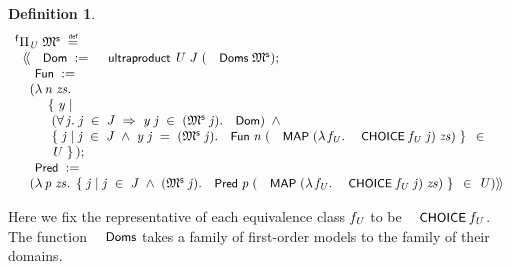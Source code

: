 \documentclass{llncs}
\newtheorem{defn}{Definition}[chapter]
\newenvironment{holmath}{\begin{displaymath}\begin{array}{l}}{\end{array}\end{displaymath}\ignorespacesafterend}
\renewcommand{\HOLConst}[1]{{\textsf{\upshape\small #1}}}
\renewcommand{\HOLinline}[1]{\ensuremath{#1}}
\renewcommand{\HOLFieldName}[1]{\HOLConst{#1}}
\renewcommand{\HOLTokenLeftrec}{\ensuremath{\langle\!\langle}}
\renewcommand{\HOLTokenRightrec}{\ensuremath{\rangle\!\rangle}}
\renewcommand{\HOLTokenBar}{\mbox{$|$}}
\begin{document}
\begin{defn}
{\upshape\cite[Definition A.18 (Ultraproduct of First-Order Models)]{Blackburn}}
\begin{holmath}
  {}^{\sf f}\Pi\sb{\HOLFreeVar{U}}\;\HOLFreeVar{\ensuremath{\mathfrak{M}\sp{\sf s}}}\;\HOLTokenDefEquality{}\\
\;\;\HOLTokenLeftrec{}\HOLFieldName{Dom}\;:=\;\HOLConst{ultraproduct}\;\HOLFreeVar{U}\;\HOLFreeVar{J}\;(\HOLConst{Doms}\;\HOLFreeVar{\ensuremath{\mathfrak{M}\sp{\sf s}}});\\
\;\;\HOLFieldName{Fun}\;:=\\
\;\;\;\;(\HOLTokenLambda{}\HOLBoundVar{n}\;\HOLBoundVar{zs}.\\
\;\;\;\;\;\;\;\;\;\HOLTokenLeftbrace{}\HOLBoundVar{y}\;\HOLTokenBar{}\\
\;\;\;\;\;\;\;\;\;\;(\HOLSymConst{\HOLTokenForall{}}\HOLBoundVar{j}.\;\HOLBoundVar{j}\;\HOLSymConst{\HOLTokenIn{}}\;\HOLFreeVar{J}\;\HOLSymConst{\HOLTokenImp{}}\;\HOLBoundVar{y}\;\HOLBoundVar{j}\;\HOLSymConst{\HOLTokenIn{}}\;(\HOLFreeVar{\ensuremath{\mathfrak{M}\sp{\sf s}}}\;\HOLBoundVar{j}).\HOLFieldName{Dom})\;\HOLSymConst{\HOLTokenConj{}}\\
\;\;\;\;\;\;\;\;\;\;\HOLTokenLeftbrace{}\HOLBoundVar{j}\;\HOLTokenBar{}\;\HOLBoundVar{j}\;\HOLSymConst{\HOLTokenIn{}}\;\HOLFreeVar{J}\;\HOLSymConst{\HOLTokenConj{}}\;\HOLBoundVar{y}\;\HOLBoundVar{j}\;\HOLSymConst{=}\;(\HOLFreeVar{\ensuremath{\mathfrak{M}\sp{\sf s}}}\;\HOLBoundVar{j}).\HOLFieldName{Fun}\;\HOLBoundVar{n}\;(\HOLConst{MAP}\;(\HOLTokenLambda{}\HOLBoundVar{\ensuremath{f\sb{U}}}.\;\HOLConst{CHOICE}\;\HOLBoundVar{\ensuremath{f\sb{U}}}\;\HOLBoundVar{j})\;\HOLBoundVar{zs})\HOLTokenRightbrace{}\;\HOLSymConst{\HOLTokenIn{}}\\
\;\;\;\;\;\;\;\;\;\;\HOLFreeVar{U}\HOLTokenRightbrace{});\\
\;\;\HOLFieldName{Pred}\;:=\\
\;\;\;\;(\HOLTokenLambda{}\HOLBoundVar{p}\;\HOLBoundVar{zs}.\;\HOLTokenLeftbrace{}\HOLBoundVar{j}\;\HOLTokenBar{}\;\HOLBoundVar{j}\;\HOLSymConst{\HOLTokenIn{}}\;\HOLFreeVar{J}\;\HOLSymConst{\HOLTokenConj{}}\;(\HOLFreeVar{\ensuremath{\mathfrak{M}\sp{\sf s}}}\;\HOLBoundVar{j}).\HOLFieldName{Pred}\;\HOLBoundVar{p}\;(\HOLConst{MAP}\;(\HOLTokenLambda{}\HOLBoundVar{\ensuremath{f\sb{U}}}.\;\HOLConst{CHOICE}\;\HOLBoundVar{\ensuremath{f\sb{U}}}\;\HOLBoundVar{j})\;\HOLBoundVar{zs})\HOLTokenRightbrace{}\;\HOLSymConst{\HOLTokenIn{}}\;\HOLFreeVar{U})\HOLTokenRightrec{}
\end{holmath}
\end{defn}
Here we fix the representative of each equivalence class \HOLinline{\HOLFreeVar{\ensuremath{f\sb{U}}}} to be \HOLinline{\HOLConst{CHOICE}\;\HOLFreeVar{\ensuremath{f\sb{U}}}}. The function \HOLinline{\HOLConst{Doms}} takes a family of first-order models to the family of their domains. 
\end{document}
